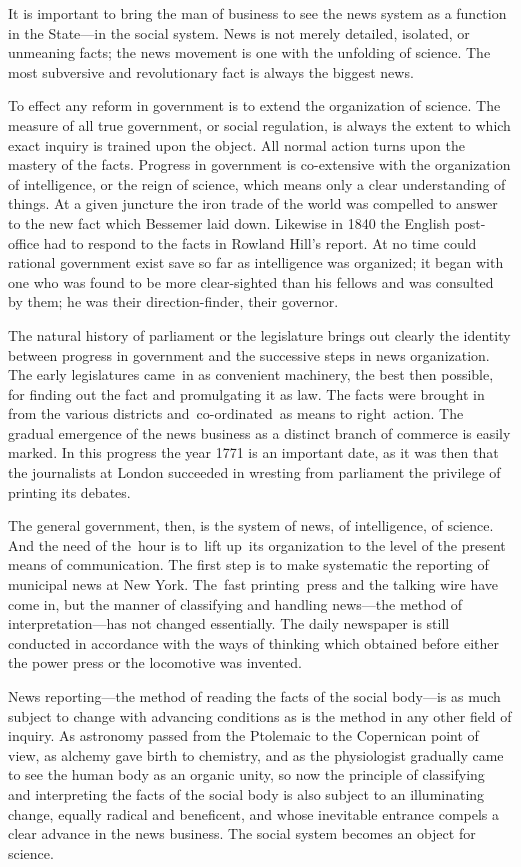 \documentclass[twoside,symmetric,nobib,justified]{tufte-book}
\begin{document}
It is important to bring the man of business to see the news system as a
function in the State---in the social system. News is not merely
detailed, isolated, or unmeaning facts; the news movement is one with
the unfolding of science. The most subversive and revolutionary fact is
always the biggest news. ~

To effect any reform in government is to extend the organization of
science. The measure of all true government, or social regulation, is
always the extent to which exact inquiry is trained upon the object. All
normal action turns upon the mastery of the facts. Progress in
government is co-extensive with the organization of intelligence, or the
reign of science, which means only a clear understanding of things. At a
given juncture the iron trade of the world was compelled to answer to
the new fact which Bessemer laid down. Likewise in 1840 the English
post-office had to respond to the facts in Rowland Hill's report. At no
time could rational government exist save so far as intelligence was
organized; it began with one who was found to be more clear-sighted than
his fellows and was consulted by them; he was their direction-finder,
their governor. ~

The natural history of parliament or the legislature brings out clearly
the identity between progress in government and the successive steps in
news organization. The early legislatures came~in as convenient
machinery, the best then possible, for finding out the fact and
promulgating it as law. The facts were brought in from the various
districts and~co-ordinated~as means to right~action. The gradual
emergence of the news business as a distinct branch of commerce is
easily marked. In this progress the year 1771 is an important date, as
it was then that the journalists at London succeeded in wresting from
parliament the privilege of printing its debates.~

The general government, then, is the system of news, of intelligence, of
science. And the need of the~hour is to~lift up~its organization to the
level of the present means of communication. The first step is to make
systematic the reporting of municipal news at New York. The~fast
printing~press and the talking wire have come in, but the manner of
classifying and handling news---the method of interpretation---has not
changed essentially. The daily newspaper is still conducted in
accordance with the ways of thinking which obtained before either the
power press or the locomotive was invented.~

News reporting---the method of reading the facts of the social body---is
as much subject to change with advancing conditions as is the method in
any other field of inquiry. As astronomy passed from the Ptolemaic to
the Copernican point of view, as alchemy gave birth to chemistry, and as
the physiologist gradually came to see the human body as an organic
unity, so now the principle of classifying and interpreting the facts of
the social body is also subject to an illuminating change, equally
radical and beneficent, and whose inevitable entrance compels a clear
advance in the news business. The social system becomes an object for
science.~
\end{document}
